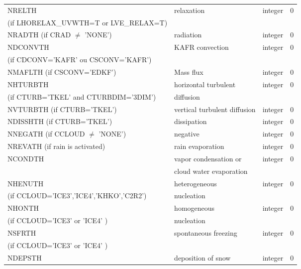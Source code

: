 \begin{center}
\begin{tabular} {|p{8cm}|p{4cm}|>{\centering}p{1.5cm}|p{1.5cm}<{\centering}|}
NRELTH   & relaxation        & integer  &  0 \index{NRELTH!\innam{NAM\_BU\_RTH}}\\
(if LHORELAX\_UVWTH=T or LVE\_RELAX=T) &  &   &   \\\hline
NRADTH (if CRAD $\neq$ 'NONE')  & radiation           & integer  &  0 \index{NRADTH!\innam{NAM\_BU\_RTH}}\\\hline
NDCONVTH & KAFR convection          & integer  &  0 \index{NDCONVTH!\innam{NAM\_BU\_RTH}}\\
(if CDCONV='KAFR' ou CSCONV='KAFR') &  &   &   \\\hline
NMAFLTH (if CSCONV='EDKF') & Mass flux & integer  &  0 \index{NMAFLTH!\innam{NAM\_BU\_RTH}} \\\hline
NHTURBTH & horizontal turbulent & integer  &  0 \index{NHTURBTH!\innam{NAM\_BU\_RTH}}\\
(if CTURB='TKEL' and CTURBDIM='3DIM') & diffusion&   &  \\\hline
NVTURBTH (if CTURB='TKEL') & vertical turbulent diffusion & integer  &  0 \index{NVTURBTH!\innam{NAM\_BU\_RTH}}\\\hline
NDISSHTH (if CTURB='TKEL') & dissipation         & integer  &  0 \index{NDISSHTH!\innam{NAM\_BU\_RTH}}\\\hline
NNEGATH  (if CCLOUD $\neq$ 'NONE') & negative            & integer  &  0 \index{NNEGATH!\innam{NAM\_BU\_RTH}}\\\hline
NREVATH (if rain is activated)  & rain evaporation    & integer  &  0 \index{NREVATH!\innam{NAM\_BU\_RTH}}\\\hline
NCONDTH  & vapor condensation  or     & integer  &  0 \index{NCONDTH!\innam{NAM\_BU\_RTH}}\\
         & cloud water  evaporation  &          &    \\\hline
NHENUTH   & heterogeneous  & integer  &  0 \index{NHENUTH!\innam{NAM\_BU\_RTH}}\\
(if CCLOUD='ICE3','ICE4','KHKO','C2R2') &nucleation &   &  \\\hline
NHONTH   & homogeneous  & integer  &  0 \index{NHONTH!\innam{NAM\_BU\_RTH}}\\
(if CCLOUD='ICE3' or 'ICE4' ) & nucleation&   &  \\\hline
NSFRTH   & spontaneous freezing& integer  &  0 \index{NSFRTH!\innam{NAM\_BU\_RTH}}\\
(if CCLOUD='ICE3' or 'ICE4' ) & &   &  \\\hline
NDEPSTH  & deposition of snow  & integer  &  0 \index{NDEPSTH!\innam{NAM\_BU\_RTH}}\\

\end{tabular}
\end{center}
